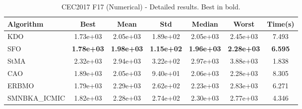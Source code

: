 \begin{table}[H]
\centering\small
\caption{CEC2017 F17 (Numerical) - Detailed results. Best in bold.}
\label{tab:cec2017_F17}
\begin{tabular}{lcccccc}
\toprule
\textbf{Algorithm} & \textbf{Best} & \textbf{Mean} & \textbf{Std} & \textbf{Median} & \textbf{Worst} & \textbf{Time(s)} \\
\midrule
KDO & 1.73e+03 & 2.05e+03 & 1.89e+02 & 2.05e+03 & 2.45e+03 & 7.493 \\
SFO & \textbf{1.78e+03} & \textbf{1.98e+03} & \textbf{1.15e+02} & \textbf{1.96e+03} & \textbf{2.28e+03} & \textbf{6.595} \\
StMA & 2.32e+03 & 2.94e+03 & 3.22e+02 & 2.97e+03 & 3.88e+03 & 1.838 \\
CAO & 1.89e+03 & 2.05e+03 & 9.40e+01 & 2.06e+03 & 2.28e+03 & 8.305 \\
ERBMO & 1.79e+03 & 2.29e+03 & 2.62e+02 & 2.23e+03 & 2.83e+03 & 6.271 \\
SMNBKA_ICMIC & 1.82e+03 & 2.28e+03 & 2.74e+02 & 2.30e+03 & 2.77e+03 & 4.346 \\
\bottomrule
\end{tabular}
\end{table}
